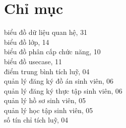 


\begin{titlepage}
	
	
	
	\newpage
	\tableofcontents
\end{titlepage}
\newpage
\setcounter{page}{1}
\rfoot{\thepage}






	
	



% 





\newpage
\chapter*{Chỉ mục}
\noindent biểu đồ dữ liệu quan hệ, 31 \\
biểu đồ lớp, 14 \\
biểu đồ phân cấp chức năng, 10 \\
biểu đồ usecase, 11 \\
điểm trung bình tích luỹ, 04 \\
quản lý đăng ký đồ án sinh viên, 06 \\
quản lý đăng ký thực tập sinh viên, 06 \\
quản lý hồ sơ sinh viên, 05 \\
quản lý học tập sinh viên, 05 \\
số tín chỉ tích luỹ, 04 \\

